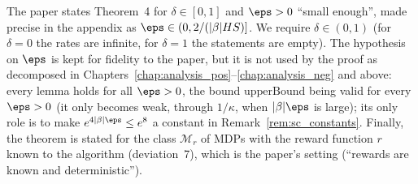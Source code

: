 \begin{remark}\label{rem:sc_hypotheses}
The paper states Theorem~4 for $\delta \in [0,1]$ and $\eps > 0$ ``small enough'', made precise
in the appendix as $\eps \in (0, 2/(|\beta|HS)]$. We require $\delta \in (0,1)$ (for $\delta = 0$
the rates are infinite, for $\delta = 1$ the statements are empty). The hypothesis on $\eps$ is
kept for fidelity to the paper, but it is not used by the proof as decomposed in
Chapters~\ref{chap:analysis_pos}--\ref{chap:analysis_neg} and above: every lemma holds for all
$\eps > 0$, the bound $\mathrm{upperBound}$ being valid for every $\eps > 0$ (it only becomes
weak, through $1/\kappa$, when $|\beta|\eps$ is large); its only role is to make
$e^{4|\beta|\eps} \le e^8$ a constant in Remark~\ref{rem:sc_constants}. Finally, the theorem
is stated for the class $\mathcal M_r$ of MDPs with the reward function $r$ known to the
algorithm (deviation~7), which is the paper's setting (``rewards are known and
deterministic'').
\end{remark}
